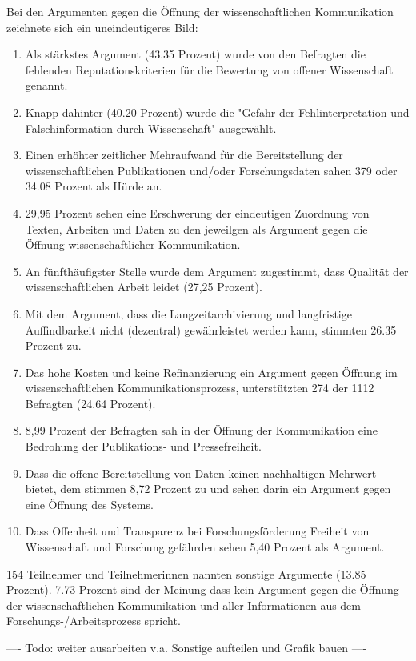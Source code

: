Bei den Argumenten gegen die Öffnung der wissenschaftlichen Kommunikation zeichnete sich ein uneindeutigeres Bild:
\begin{enumerate}
\item Als stärkstes Argument (43.35 Prozent) wurde von den Befragten die fehlenden Reputationskriterien für die Bewertung von offener Wissenschaft genannt.
\item Knapp dahinter (40.20 Prozent) wurde die "Gefahr der Fehlinterpretation und Falschinformation durch Wissenschaft" ausgewählt.
\item Einen erhöhter zeitlicher Mehraufwand für die Bereitstellung der wissenschaftlichen Publikationen und/oder Forschungsdaten sahen 379 oder 34.08 Prozent als Hürde an.
\item 29,95 Prozent sehen eine Erschwerung der eindeutigen Zuordnung von Texten, Arbeiten und Daten zu den jeweilgen als Argument gegen die Öffnung wissenschaftlicher Kommunikation.
\item  An fünfthäufigster Stelle wurde dem Argument zugestimmt, dass Qualität der wissenschaftlichen Arbeit leidet (27,25 Prozent).
\item Mit dem Argument, dass die Langzeitarchivierung und langfristige Auffindbarkeit nicht (dezentral) gewährleistet werden kann, stimmten 26.35 Prozent zu.
\item Das hohe Kosten und keine Refinanzierung ein Argument gegen Öffnung im wissenschaftlichen Kommunikationsprozess, unterstützten 274 der 1112 Befragten (24.64 Prozent).
\item 8,99 Prozent der Befragten sah in der Öffnung der Kommunikation eine Bedrohung der Publikations- und Pressefreiheit.
\item Dass die offene Bereitstellung von Daten keinen nachhaltigen Mehrwert bietet, dem stimmen 8,72 Prozent zu und sehen darin ein Argument gegen eine Öffnung des Systems.
\item Dass Offenheit und Transparenz bei Forschungsförderung Freiheit von Wissenschaft und Forschung gefährden sehen 5,40 Prozent als Argument.
\end{enumerate}

154 Teilnehmer und Teilnehmerinnen nannten sonstige Argumente (13.85 Prozent). 7.73 Prozent sind der Meinung dass kein Argument gegen die Öffnung der wissenschaftlichen Kommunikation und aller Informationen aus dem Forschungs-/Arbeitsprozess spricht.

---- Todo: weiter ausarbeiten v.a. Sonstige aufteilen und Grafik bauen ----

